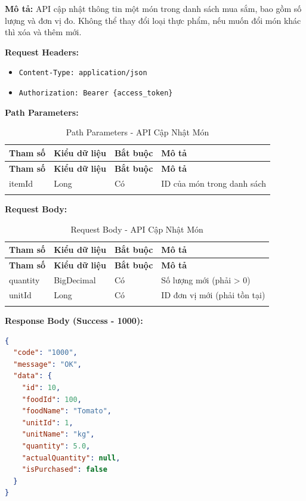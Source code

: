 \textbf{Mô tả:} API cập nhật thông tin một món trong danh sách mua sắm, bao gồm số lượng và đơn vị đo. Không thể thay đổi loại thực phẩm, nếu muốn đổi món khác thì xóa và thêm mới.

\textbf{Request Headers:}
\begin{itemize}
    \item \texttt{Content-Type: application/json}
    \item \texttt{Authorization: Bearer \{access\_token\}}
\end{itemize}

\textbf{Path Parameters:}

\small
\begin{longtable}{|>{\raggedright\arraybackslash}p{3cm}|>{\raggedright\arraybackslash}p{2.5cm}|>{\raggedright\arraybackslash}p{2cm}|>{\raggedright\arraybackslash}p{6cm}|}
\hline
\textbf{Tham số} & \textbf{Kiểu dữ liệu} & \textbf{Bắt buộc} & \textbf{Mô tả} \\
\hline
\endfirsthead
\hline
\textbf{Tham số} & \textbf{Kiểu dữ liệu} & \textbf{Bắt buộc} & \textbf{Mô tả} \\
\hline
\endhead
itemId & Long & Có & ID của món trong danh sách \\
\hline
\caption{Path Parameters - API Cập Nhật Món}
\end{longtable}

\textbf{Request Body:}

\small
\begin{longtable}{|>{\raggedright\arraybackslash}p{3cm}|>{\raggedright\arraybackslash}p{2.5cm}|>{\raggedright\arraybackslash}p{2cm}|>{\raggedright\arraybackslash}p{6cm}|}
\hline
\textbf{Tham số} & \textbf{Kiểu dữ liệu} & \textbf{Bắt buộc} & \textbf{Mô tả} \\
\hline
\endfirsthead
\hline
\textbf{Tham số} & \textbf{Kiểu dữ liệu} & \textbf{Bắt buộc} & \textbf{Mô tả} \\
\hline
\endhead
quantity & BigDecimal & Có & Số lượng mới (phải > 0) \\
\hline
unitId & Long & Có & ID đơn vị mới (phải tồn tại) \\
\hline
\caption{Request Body - API Cập Nhật Món}
\end{longtable}

\textbf{Response Body (Success - 1000):}

\begin{lstlisting}[language=json, caption=Response thanh cong API 1.9]
{
  "code": "1000",
  "message": "OK",
  "data": {
    "id": 10,
    "foodId": 100,
    "foodName": "Tomato",
    "unitId": 1,
    "unitName": "kg",
    "quantity": 5.0,
    "actualQuantity": null,
    "isPurchased": false
  }
}
\end{lstlisting}

